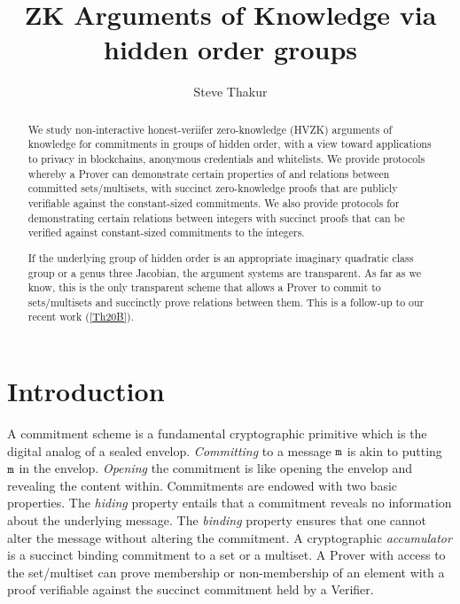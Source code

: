 \documentclass[11pt, lettersize, notitlepage, leqno, footskip=0.6cm]{article}
\numberwithin{equation}{section}
\begin{document}
 
\title{ZK Arguments of Knowledge via hidden order groups}
\author{Steve Thakur}
\affil{}
\date{\vspace{-6ex}}
 
\maketitle

\begin{abstract} We study non-interactive honest-veriifer zero-knowledge (HVZK) arguments of knowledge for commitments in groups of hidden order, with a view toward applications to privacy in blockchains, anonymous credentials and whitelists. We provide protocols whereby a Prover can demonstrate certain properties of and relations between committed sets/multisets, with succinct zero-knowledge proofs that are publicly verifiable against the constant-sized commitments. We also provide protocols for demonstrating certain relations between integers with succinct proofs that can be verified against constant-sized commitments to the integers.

If the underlying group of hidden order is an appropriate imaginary quadratic class group or a genus three Jacobian, the argument systems are transparent. As far as we know, this is the only transparent scheme that allows a Prover to commit to sets/multisets and succinctly prove relations between them. This is a follow-up to our recent work (\hyperlink{Th20}{[Th20B]}).\end{abstract}

\section{\fontsize{12}{12}\selectfont Introduction  }

A commitment scheme is a fundamental cryptographic primitive which is the digital analog of a sealed envelop. \textit{Committing} to a message $\tt{m}$ is akin to putting $\tt{m}$ in the envelop. \textit{Opening} the commitment is like opening the envelop and revealing the content within. Commitments are endowed with two basic properties. The \textit{hiding} property entails that a commitment reveals no information about the underlying message. The \textit{binding} property ensures that one cannot alter the message without altering the commitment. A cryptographic \textit{accumulator} is a succinct binding commitment to a set or a multiset. A Prover with access to the set/multiset can prove membership or non-membership of an element with a proof verifiable against the succinct commitment held by a Verifier. 
\end{document}
